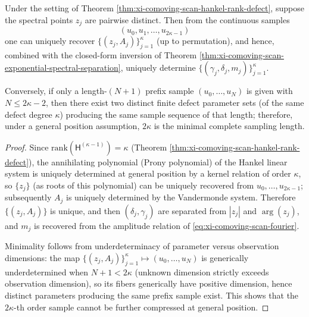 \begin{theorem}\label{thm:xi-scan-minimal-complete-2kappa}
Under the setting of Theorem \ref{thm:xi-comoving-scan-hankel-rank-defect}, suppose the spectral points \(z_j\) are pairwise distinct.
Then from the continuous samples
\[
\boxed{\;
(u_0,u_1,\dots,u_{2\kappa-1})\;}
\]
one can uniquely recover \(\{(z_j,A_j)\}_{j=1}^{\kappa}\) (up to permutation), and hence, combined with the closed-form inversion of Theorem \ref{thm:xi-comoving-scan-exponential-spectral-separation}, uniquely determine
\(\{(\gamma_j,\delta_j,m_j)\}_{j=1}^{\kappa}\).
\par
Conversely, if only a length-\((N+1)\) prefix sample \((u_0,\dots,u_{N})\) is given with \(N\le 2\kappa-2\),
then there exist two distinct finite defect parameter sets (of the same defect degree \(\kappa\)) producing the same sample sequence of that length;
therefore, under a general position assumption, \(2\kappa\) is the minimal complete sampling length.
\end{theorem}

\begin{proof}
Since \(\mathrm{rank}(\mathsf H^{(\kappa-1)})=\kappa\) (Theorem \ref{thm:xi-comoving-scan-hankel-rank-defect}), the annihilating polynomial (Prony polynomial) of the Hankel linear system is uniquely determined at general position by a kernel relation of order \(\kappa\), so \(\{z_j\}\) (as roots of this polynomial) can be uniquely recovered from \(u_0,\dots,u_{2\kappa-1}\); subsequently \(A_j\) is uniquely determined by the Vandermonde system.
Therefore \(\{(z_j,A_j)\}\) is unique, and then \((\delta_j,\gamma_j)\) are separated from \(|z_j|\) and \(\arg(z_j)\), and \(m_j\) is recovered from the amplitude relation of \eqref{eq:xi-comoving-scan-fourier}.
\par
Minimality follows from underdeterminacy of parameter versus observation dimensions: the map
\(
\{(z_j,A_j)\}_{j=1}^{\kappa}\mapsto (u_0,\dots,u_N)
\)
is generically underdetermined when \(N+1<2\kappa\) (unknown dimension strictly exceeds observation dimension), so its fibers generically have positive dimension, hence distinct parameters producing the same prefix sample exist.
This shows that the \(2\kappa\)-th order sample cannot be further compressed at general position. \qedhere
\end{proof}

